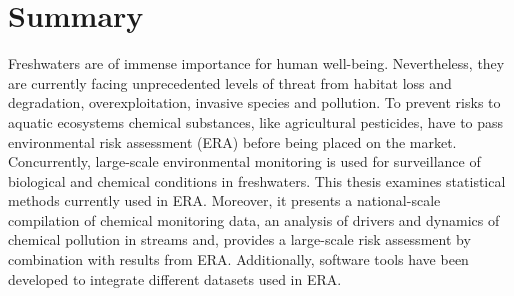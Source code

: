 



\thispagestyle{empty}
\begingroup
\let\clearpage\relax
\let\cleardoublepage\relax
\let\cleardoublepage\relax
\chapter*{Summary}
\thispagestyle{empty}

Freshwaters are of immense importance for human well-being.
Nevertheless, they are currently facing unprecedented levels of threat from habitat loss and degradation, overexploitation, invasive species and
pollution. 
To prevent risks to aquatic ecosystems chemical substances, like agricultural pesticides, have to pass environmental risk assessment (ERA) before being placed on the market. 
Concurrently, large-scale environmental monitoring is used for surveillance of biological and chemical conditions in freshwaters. 
This thesis examines statistical methods currently used in ERA.
Moreover, it presents a national-scale compilation of chemical monitoring data, an analysis of drivers and dynamics of chemical pollution in streams and, provides a large-scale risk assessment by combination with results from ERA.
Additionally, software tools have been developed to integrate different datasets used in ERA.

